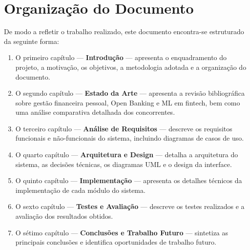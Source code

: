 \section{Organização do Documento}
\label{sec:organizacao}

De modo a refletir o trabalho realizado, este documento encontra-se estruturado da seguinte forma:

\begin{enumerate}
    \item O primeiro capítulo --- \textbf{Introdução} --- apresenta o enquadramento do projeto, a motivação, os objetivos, a metodologia adotada e a organização do documento.
    \item O segundo capítulo --- \textbf{Estado da Arte} --- apresenta a revisão bibliográfica sobre gestão financeira pessoal, Open Banking e \ac{ML} em fintech, bem como uma análise comparativa detalhada dos concorrentes.
    \item O terceiro capítulo --- \textbf{Análise de Requisitos} --- descreve os requisitos funcionais e não-funcionais do sistema, incluindo diagramas de casos de uso.
    \item O quarto capítulo --- \textbf{Arquitetura e Design} --- detalha a arquitetura do sistema, as decisões técnicas, os diagramas \ac{UML} e o design da interface.
    \item O quinto capítulo --- \textbf{Implementação} --- apresenta os detalhes técnicos da implementação de cada módulo do sistema.
    \item O sexto capítulo --- \textbf{Testes e Avaliação} --- descreve os testes realizados e a avaliação dos resultados obtidos.
    \item O sétimo capítulo --- \textbf{Conclusões e Trabalho Futuro} --- sintetiza as principais conclusões e identifica oportunidades de trabalho futuro.
\end{enumerate}
